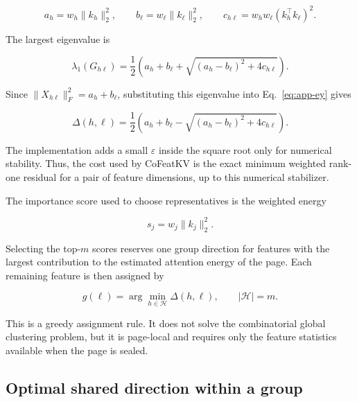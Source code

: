 \documentclass{article} %
\begin{document}
\begin{equation}
    a_h=w_h\|k_h\|_2^2,\qquad
    b_\ell=w_\ell\|k_\ell\|_2^2,\qquad
    c_{h\ell}=w_hw_\ell(k_h^{\top}k_\ell)^2.
\end{equation}

The largest eigenvalue is

\begin{equation}
    \lambda_1(G_{h\ell})
    =\frac{1}{2}\left(a_h+b_\ell+
    \sqrt{(a_h-b_\ell)^2+4c_{h\ell}}\right).
\end{equation}

Since $\|X_{h\ell}\|_F^2=a_h+b_\ell$, substituting this eigenvalue into
Eq.~\eqref{eq:app-ey} gives

\begin{equation}
    \Delta(h,\ell)
    =\frac{1}{2}\left(a_h+b_\ell-
    \sqrt{(a_h-b_\ell)^2+4c_{h\ell}}\right).
    \label{eq:app-merge-cost}
\end{equation}

The implementation adds a small $\varepsilon$ inside the square root only
for numerical stability. Thus, the cost used by CoFeatKV is the exact minimum
weighted rank-one residual for a pair of feature dimensions, up to this
numerical stabilizer.

The importance score used to choose representatives is the weighted energy

\begin{equation}
    s_j=w_j\|k_j\|_2^2.
    \label{eq:app-importance}
\end{equation}

Selecting the top-$m$ scores reserves one group direction for features with
the largest contribution to the estimated attention energy of the page. Each
remaining feature is then assigned by

\begin{equation}
    g(\ell)=\arg\min_{h\in\mathcal{H}}\Delta(h,\ell),
    \qquad |\mathcal{H}|=m.
    \label{eq:app-assignment}
\end{equation}

This is a greedy assignment rule. It does not solve the combinatorial global
clustering problem, but it is page-local and requires only the feature
statistics available when the page is sealed.

\subsection{Optimal shared direction within a group}
\label{app:group-direction}
\end{document}

